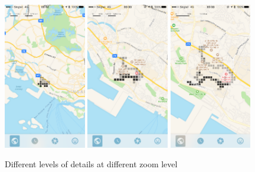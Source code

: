 \documentclass[12pt,a4paper]{article}
\begin{document}
            \begin{figure}
                \includegraphics[width=0.32\textwidth]{4-1-4-a}
                \includegraphics[width=0.32\textwidth]{4-1-4-b}
                \includegraphics[width=0.32\textwidth]{4-1-4-c}
                \centering
                \caption{Different levels of details at different zoom level}
                \label{fig:history-overview}
            \end{figure}
            
\end{document}
